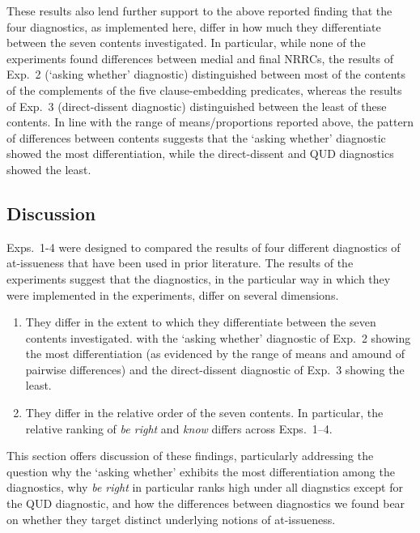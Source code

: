 \documentclass[times,linguex,xcolor]{glossa}
\begin{document}
    These results also lend further support to the above reported finding that the four diagnostics, as implemented here, differ in how much they differentiate between the seven contents investigated. In particular, while none of the experiments found differences between medial and final NRRCs, the results of Exp.~2 (`asking whether' diagnostic) distinguished between most of the contents of the complements of the five clause-embedding predicates, whereas the results of Exp.~3 (direct-dissent diagnostic) distinguished between the least of these contents. In line with the range of means/proportions reported above, the pattern of differences between contents suggests that the `asking whether' diagnostic showed the most differentiation, while the direct-dissent and QUD diagnostics showed the least.

  \subsection{Discussion}

    Exps.~1-4 were designed to compared the results of four different diagnostics of at-issueness that have been used in prior literature. The results of the experiments suggest that the diagnostics, in the particular way in which they were implemented in the experiments, differ on several dimensions.
    \begin{enumerate}
      \item They differ in the extent to which they differentiate between the seven contents investigated. with the `asking whether' diagnostic of Exp.~2 showing the most differentiation (as evidenced by the range of means and amound of pairwise differences) and the direct-dissent diagnostic of Exp.~3 showing the least.

      \item They differ in the relative order of the seven contents. In particular, the relative ranking of \emph{be right} and \emph{know} differs across Exps.~1--4.

    \end{enumerate}

    This section offers discussion of these findings, particularly addressing the question why the `asking whether' exhibits the most differentiation among the diagnostics, why \emph{be right} in particular ranks high under all diagnstics except for the QUD diagnostic, and how the differences between diagnostics we found bear on whether they target distinct underlying notions of at-issueness.
\end{document}
